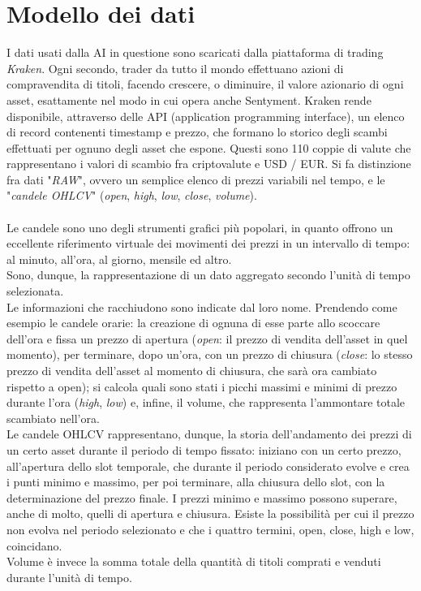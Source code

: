 \documentclass[a4paper,12pt]{report}
\begin{document}
\section{Modello dei dati}
I dati usati dalla AI in questione sono scaricati dalla piattaforma di trading \textit{Kraken}. Ogni secondo, trader da tutto il mondo effettuano azioni di compravendita di titoli, facendo crescere, o diminuire, il valore azionario di ogni asset, esattamente nel modo in cui opera anche Sentyment. Kraken rende disponibile, attraverso delle API (application programming interface), un elenco di record contenenti timestamp e prezzo, che formano lo storico degli scambi effettuati per ognuno degli asset che espone. Questi sono 110 coppie di valute che rappresentano i valori di scambio fra criptovalute e USD / EUR. Si fa distinzione fra dati "\textit{RAW}", ovvero un semplice elenco di prezzi variabili nel tempo, e le "\textit{candele OHLCV}" (\textit{open}, \textit{high}, \textit{low}, \textit{close}, \textit{volume}).\\~\\ Le candele sono uno degli strumenti grafici più popolari, in quanto offrono un eccellente riferimento virtuale dei movimenti dei prezzi in un intervallo di tempo: al minuto, all'ora, al giorno, mensile ed altro.\\Sono, dunque, la rappresentazione di un dato aggregato secondo l'unità di tempo selezionata.\\Le informazioni che racchiudono sono indicate dal loro nome. Prendendo come esempio le candele orarie: la creazione di ognuna di esse parte allo scoccare dell'ora e fissa un prezzo di apertura (\textit{open}: il prezzo di vendita dell'asset in quel momento), per terminare, dopo un'ora, con un prezzo di chiusura (\textit{close}: lo stesso prezzo di vendita dell'asset al momento di chiusura, che sarà ora cambiato rispetto a open); si calcola quali sono stati i picchi massimi e minimi di prezzo durante l'ora (\textit{high}, \textit{low}) e, infine, il volume, che rappresenta l'ammontare totale scambiato nell'ora.\\
Le candele OHLCV rappresentano, dunque, la storia dell'andamento dei prezzi di un certo asset durante il periodo di tempo fissato: iniziano con un certo prezzo, all'apertura dello slot temporale, che durante il periodo considerato evolve e crea i punti minimo e massimo, per poi terminare, alla chiusura dello slot, con la determinazione del prezzo finale. I prezzi minimo e massimo possono superare, anche di molto, quelli di apertura e chiusura. Esiste la possibilità per cui il prezzo non evolva nel periodo selezionato e che i quattro termini, open, close, high e low, coincidano.\\ Volume è invece la somma totale della quantità di titoli comprati e venduti durante l'unità di tempo.\\~\\
\end{document}
